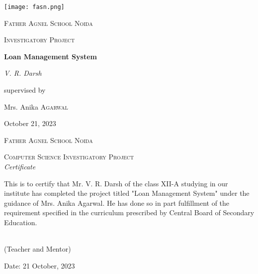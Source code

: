 \documentclass[12pt,a4paper]{article}
\begin{document}
	\begin{titlepage}
		\centering
		\texttt{[image: fasn.png]}\par\vspace{1cm}
		{\scshape\LARGE Father Agnel School Noida \par}
		\vspace{1cm}
		{\scshape\Large Investigatory Project\par}
		\vspace{1.5cm}
		{\huge\bfseries Loan Management System\par}
		\vspace{2cm}
		{\Large\itshape V. R. Darsh\par}
		\vfill
		supervised by\par
		Mrs. Anika \textsc{Agarwal}
		
		\vfill
		
		{\large October 21, 2023\par}
	\end{titlepage}
	\newpage
	\thispagestyle{empty}
	
	\begin{large}
		\begin{center}
			
			{\scshape\huge Father Agnel School Noida \par}
			\vspace{1cm}
			\normalsize
			\textsc{Computer Science Investigatory Project}\\[2.0cm]
			
			\emph{\huge Certificate}\\[2.5cm]
		\end{center}
		\normalsize This is to certify that Mr. V. R. Darsh of the class XII-A studying in our institute has completed the project titled "Loan Management System" under the guidance of Mrs. Anika Agarwal. He has done so in part fulfillment of the requirement specified in the curriculum prescribed by Central Board of Secondary Education.\\[1.0cm]
		
		
		\vfill
		
		
		\\ \mbox{}\hfill (Teacher and Mentor) \\[1.5cm]
		
		\begin{flushleft}
			Date: 21 October, 2023
		\end{flushleft}
		
		
		\newpage
		\thispagestyle{empty}
	\end{large}
	
\end{document}
